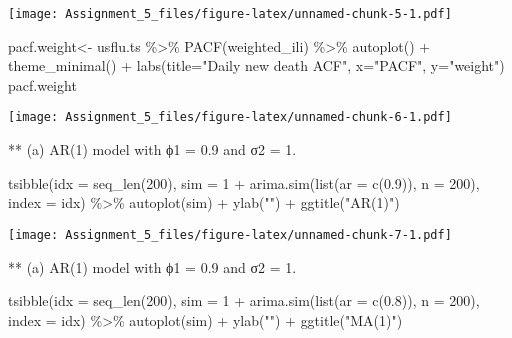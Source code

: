 \documentclass[
]{article}
\newenvironment{Shaded}{\begin{snugshade}}{\end{snugshade}}
\newcommand{\AttributeTok}[1]{\textcolor[rgb]{0.77,0.63,0.00}{#1}}
\newcommand{\DecValTok}[1]{\textcolor[rgb]{0.00,0.00,0.81}{#1}}
\newcommand{\FloatTok}[1]{\textcolor[rgb]{0.00,0.00,0.81}{#1}}
\newcommand{\FunctionTok}[1]{\textcolor[rgb]{0.00,0.00,0.00}{#1}}
\newcommand{\NormalTok}[1]{#1}
\newcommand{\OtherTok}[1]{\textcolor[rgb]{0.56,0.35,0.01}{#1}}
\newcommand{\SpecialCharTok}[1]{\textcolor[rgb]{0.00,0.00,0.00}{#1}}
\newcommand{\StringTok}[1]{\textcolor[rgb]{0.31,0.60,0.02}{#1}}
\begin{document}
\texttt{[image: Assignment\_5\_files/figure-latex/unnamed-chunk-5-1.pdf]}

\begin{Shaded}
\begin{Highlighting}[]
\NormalTok{pacf.weight}\OtherTok{\textless{}{-}}\NormalTok{ usflu.ts }\SpecialCharTok{\%\textgreater{}\%} \FunctionTok{PACF}\NormalTok{(weighted\_ili) }\SpecialCharTok{\%\textgreater{}\%}
  \FunctionTok{autoplot}\NormalTok{() }\SpecialCharTok{+} \FunctionTok{theme\_minimal}\NormalTok{() }\SpecialCharTok{+} \FunctionTok{labs}\NormalTok{(}\AttributeTok{title=}\StringTok{"Daily new death ACF"}\NormalTok{,}
                         \AttributeTok{x=}\StringTok{"PACF"}\NormalTok{, }\AttributeTok{y=}\StringTok{"weight"}\NormalTok{)}
\NormalTok{pacf.weight}
\end{Highlighting}
\end{Shaded}

\texttt{[image: Assignment\_5\_files/figure-latex/unnamed-chunk-6-1.pdf]}

** (a) AR(1) model with ϕ1 = 0.9 and σ2 = 1.

\begin{Shaded}
\begin{Highlighting}[]
\FunctionTok{tsibble}\NormalTok{(}\AttributeTok{idx =} \FunctionTok{seq\_len}\NormalTok{(}\DecValTok{200}\NormalTok{), }\AttributeTok{sim =} \DecValTok{1} \SpecialCharTok{+} \FunctionTok{arima.sim}\NormalTok{(}\FunctionTok{list}\NormalTok{(}\AttributeTok{ar =} \FunctionTok{c}\NormalTok{(}\FloatTok{0.9}\NormalTok{)), }\AttributeTok{n =} \DecValTok{200}\NormalTok{), }\AttributeTok{index =}\NormalTok{ idx) }\SpecialCharTok{\%\textgreater{}\%}
\FunctionTok{autoplot}\NormalTok{(sim) }\SpecialCharTok{+} \FunctionTok{ylab}\NormalTok{(}\StringTok{""}\NormalTok{) }\SpecialCharTok{+} \FunctionTok{ggtitle}\NormalTok{(}\StringTok{"AR(1)"}\NormalTok{)}
\end{Highlighting}
\end{Shaded}

\texttt{[image: Assignment\_5\_files/figure-latex/unnamed-chunk-7-1.pdf]}

** (a) AR(1) model with ϕ1 = 0.9 and σ2 = 1.

\begin{Shaded}
\begin{Highlighting}[]
\FunctionTok{tsibble}\NormalTok{(}\AttributeTok{idx =} \FunctionTok{seq\_len}\NormalTok{(}\DecValTok{200}\NormalTok{), }\AttributeTok{sim =} \DecValTok{1} \SpecialCharTok{+} \FunctionTok{arima.sim}\NormalTok{(}\FunctionTok{list}\NormalTok{(}\AttributeTok{ar =} \FunctionTok{c}\NormalTok{(}\FloatTok{0.8}\NormalTok{)), }\AttributeTok{n =} \DecValTok{200}\NormalTok{), }\AttributeTok{index =}\NormalTok{ idx) }\SpecialCharTok{\%\textgreater{}\%}
\FunctionTok{autoplot}\NormalTok{(sim) }\SpecialCharTok{+} \FunctionTok{ylab}\NormalTok{(}\StringTok{""}\NormalTok{) }\SpecialCharTok{+} \FunctionTok{ggtitle}\NormalTok{(}\StringTok{"MA(1)"}\NormalTok{)}
\end{Highlighting}
\end{Shaded}
\end{document}
